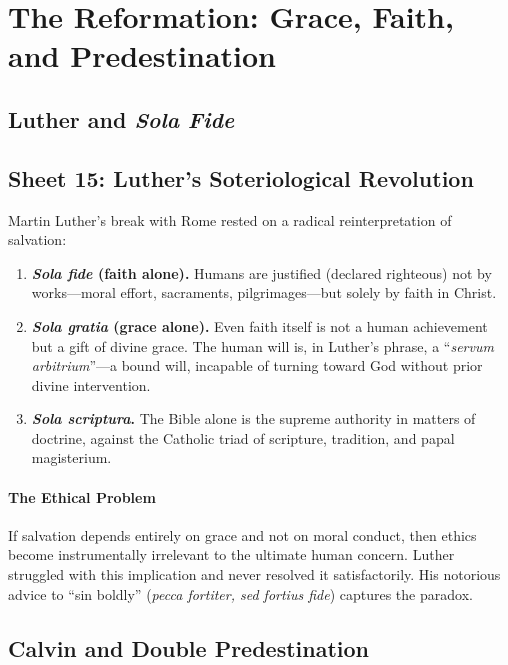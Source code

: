 \section{The Reformation: Grace, Faith, and Predestination}

\subsection{Luther and \textit{Sola Fide}}

\subsection{Sheet 15: Luther's Soteriological Revolution}

Martin Luther's break with Rome rested on a radical
reinterpretation of salvation:

\begin{enumerate}
  \item \textbf{\textit{Sola fide} (faith alone).}
    Humans are justified (declared righteous) not by works---moral effort,
    sacraments, pilgrimages---but solely by faith in Christ.
  \item \textbf{\textit{Sola gratia} (grace alone).}
    Even faith itself is not a human achievement but a gift of divine
    grace.  The human will is, in Luther's phrase, a
    ``\textit{servum arbitrium}''---a bound will,
    incapable of turning toward God without prior divine intervention.
  \item \textbf{\textit{Sola scriptura}.}
    The Bible alone is the supreme authority in matters of doctrine, against
    the Catholic triad of scripture, tradition, and papal magisterium.
\end{enumerate}

\paragraph{The Ethical Problem}
If salvation depends entirely on grace and not on moral conduct, then ethics
become instrumentally irrelevant to the ultimate human concern.  Luther
struggled with this implication and never resolved it satisfactorily.
His notorious advice to ``sin boldly'' (\textit{pecca
fortiter, sed fortius fide}) captures the paradox.

\subsection{Calvin and Double Predestination}

